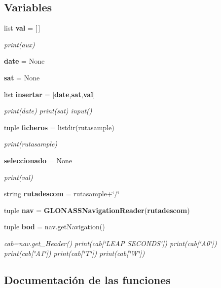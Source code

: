 \subsection*{Variables}
\begin{DoxyCompactItemize}
\item 
list {\bf val} = [$\,$]
\begin{DoxyCompactList}\small\item\em print(aux) \end{DoxyCompactList}\item 
{\bf date} = None
\item 
{\bf sat} = None
\item 
list {\bf insertar} = [{\bf date},{\bf sat},{\bf val}]
\begin{DoxyCompactList}\small\item\em print(date) print(sat) input() \end{DoxyCompactList}\item 
tuple {\bf ficheros} = listdir(rutasample)
\begin{DoxyCompactList}\small\item\em print(rutasample) \end{DoxyCompactList}\item 
{\bf seleccionado} = None
\begin{DoxyCompactList}\small\item\em print(val) \end{DoxyCompactList}\item 
string {\bf rutadescom} = rutasample+\char`\"{}/\char`\"{}
\item 
tuple {\bf nav} = {\bf G\-L\-O\-N\-A\-S\-S\-Navigation\-Reader}({\bf rutadescom})
\item 
tuple {\bf bod} = nav.\-get\-Navigation()
\begin{DoxyCompactList}\small\item\em cab=nav.\-get\-\_\-\-Header() print(cab[\char`\"{}\-L\-E\-A\-P S\-E\-C\-O\-N\-D\-S\char`\"{}]) print(cab[\char`\"{}\-A0\char`\"{}]) print(cab[\char`\"{}\-A1\char`\"{}]) print(cab[\char`\"{}\-T\char`\"{}]) print(cab[\char`\"{}\-W\char`\"{}]) \end{DoxyCompactList}\end{DoxyCompactItemize}


\subsection{Documentación de las funciones}
